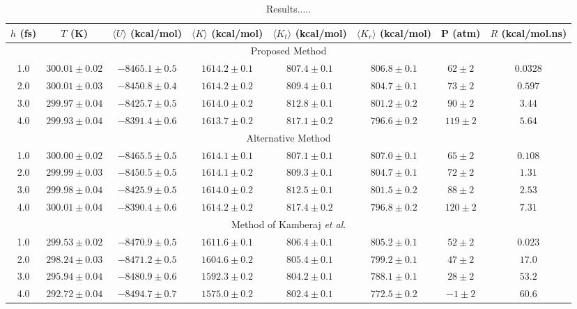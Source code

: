 \documentclass[
journal=jctcce,
layout=twocolumn
]{achemso}
\newcommand{\timestep}{h}
\begin{document}
\begin{table}
\caption{Results.....}
\label{table:proposed_method}
\begin{tabular}{cccccccc}
$\timestep$ (fs) & $T$ (K) & $\langle U\rangle$ (kcal/mol) & $\langle K\rangle$ (kcal/mol) & $\langle K_t\rangle$ (kcal/mol) & $\langle K_r\rangle$ (kcal/mol) & P (atm) & $R$ (kcal/mol.ns) \\

\hline
\multicolumn{8}{c}{Proposed Method} \\
1.0 & $300.01\pm0.02$ & $-8465.1\pm0.5$ & $1614.2\pm0.1$ & $807.4\pm0.1$ & $806.8\pm0.1$ & $62\pm2$ & $0.0328$ \\
2.0 & $300.01\pm0.03$ & $-8450.8\pm0.4$ & $1614.2\pm0.2$ & $809.4\pm0.1$ & $804.7\pm0.1$ & $73\pm2$ & $0.597$ \\
3.0 & $299.97\pm0.04$ & $-8425.7\pm0.5$ & $1614.0\pm0.2$ & $812.8\pm0.1$ & $801.2\pm0.2$ & $90\pm2$ & $3.44$ \\
4.0 & $299.93\pm0.04$ & $-8391.4\pm0.6$ & $1613.7\pm0.2$ & $817.1\pm0.2$ & $796.6\pm0.2$ & $119\pm2$ & $5.64$ \\

\hline
\multicolumn{8}{c}{Alternative Method} \\
1.0 & $300.00\pm0.02$ & $-8465.5\pm0.5$ & $1614.1\pm0.1$ & $807.1\pm0.1$ & $807.0\pm0.1$ & $65\pm2$ & $0.108$ \\
2.0 & $299.99\pm0.03$ & $-8450.5\pm0.5$ & $1614.1\pm0.2$ & $809.3\pm0.1$ & $804.7\pm0.1$ & $72\pm2$ & $1.31$ \\
3.0 & $299.98\pm0.04$ & $-8425.9\pm0.5$ & $1614.0\pm0.2$ & $812.5\pm0.1$ & $801.5\pm0.2$ & $88\pm2$ & $2.53$ \\
4.0 & $300.01\pm0.04$ & $-8390.4\pm0.6$ & $1614.2\pm0.2$ & $817.4\pm0.2$ & $796.8\pm0.2$ & $120\pm2$ & $7.31$ \\

\hline
\multicolumn{8}{c}{Method of Kamberaj \textit{et al}.\cite{Kamberaj_2005}} \\
1.0 & $299.53\pm0.02$ & $-8470.9\pm0.5$ & $1611.6\pm0.1$ & $806.4\pm0.1$ & $805.2\pm0.1$ & $52\pm2$ & $0.023$ \\
2.0 & $298.24\pm0.03$ & $-8471.2\pm0.5$ & $1604.6\pm0.2$ & $805.4\pm0.1$ & $799.2\pm0.1$ & $47\pm2$ & $17.0$ \\
3.0 & $295.94\pm0.04$ & $-8480.9\pm0.6$ & $1592.3\pm0.2$ & $804.2\pm0.1$ & $788.1\pm0.1$ & $28\pm2$ & $53.2$ \\
4.0 & $292.72\pm0.04$ & $-8494.7\pm0.7$ & $1575.0\pm0.2$ & $802.4\pm0.1$ & $772.5\pm0.2$ & $-1\pm2$ & $60.6$ \\


\end{tabular}
\end{table}
\end{document}
